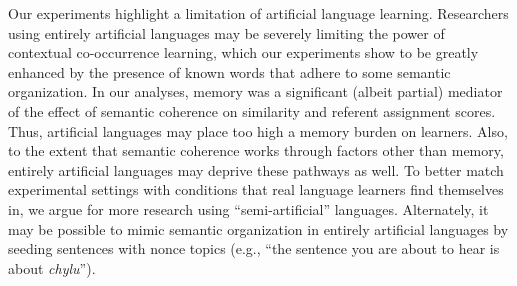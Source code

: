 \documentclass[man,floatsintext]{apa6}
\begin{document}


Our experiments highlight a limitation of artificial language learning. Researchers using entirely artificial languages may be severely limiting the power of contextual co-occurrence learning, which our experiments show to be greatly enhanced by the presence of known words that adhere to some semantic organization. In our analyses, memory was a significant (albeit partial) mediator of the effect of semantic coherence on similarity and referent assignment scores. Thus, artificial languages may place too high a memory burden on learners. Also, to the extent that semantic coherence works through factors other than memory, entirely artificial languages may deprive these pathways as well. To better match experimental settings with conditions that real language learners find themselves in, we argue for more research using ``semi-artificial'' languages. Alternately, it may be possible to mimic semantic organization in entirely artificial languages by seeding sentences with nonce topics (e.g., ``the sentence you are about to hear is about \emph{chylu}'').
\end{document}
